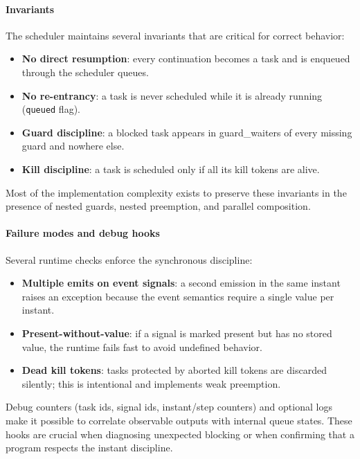 \paragraph{Invariants}
The scheduler maintains several invariants that are critical for correct
behavior:
\begin{itemize}
\item \textbf{No direct resumption}: every continuation becomes a task and is
  enqueued through the scheduler queues.
\item \textbf{No re-entrancy}: a task is never scheduled while it is already
  running (\texttt{queued} flag).
\item \textbf{Guard discipline}: a blocked task appears in guard\_waiters of
  every missing guard and nowhere else.
\item \textbf{Kill discipline}: a task is scheduled only if all its kill tokens
  are alive.
\end{itemize}
Most of the implementation complexity exists to preserve these invariants in
the presence of nested guards, nested preemption, and parallel composition.

\paragraph{Failure modes and debug hooks}
Several runtime checks enforce the synchronous discipline:
\begin{itemize}
\item \textbf{Multiple emits on event signals}: a second emission in the same
  instant raises an exception because the event semantics require a single
  value per instant.
\item \textbf{Present-without-value}: if a signal is marked present but has no
  stored value, the runtime fails fast to avoid undefined behavior.
\item \textbf{Dead kill tokens}: tasks protected by aborted kill tokens are
  discarded silently; this is intentional and implements weak preemption.
\end{itemize}
Debug counters (task ids, signal ids, instant/step counters) and optional logs
make it possible to correlate observable outputs with internal queue states.
These hooks are crucial when diagnosing unexpected blocking or when confirming
that a program respects the instant discipline.

